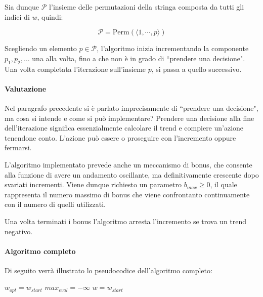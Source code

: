 Sia dunque $\mathcal{P}$ l'insieme delle permutazioni della stringa
composta da tutti gli indici di $w$, quindi:

$$
\mathcal{P} = \text{Perm}(\langle1,\cdots, p\rangle)
$$

Scegliendo un elemento $p \in \mathcal{P}$, l'algoritmo
inizia incrementando la componente $p_1, p_2, \dots$ una alla volta, fino a che
non è in grado di ``prendere una decisione".
Una volta completata l'iterazione sull'insieme $p$, si passa a quello successivo.

\paragraph{Valutazione}
Nel paragrafo precedente si è parlato imprecisamente di
``prendere una decisione", ma cosa si intende e come si può
implementare?
Prendere una decisione alla fine dell'iterazione significa essenzialmente
calcolare il trend e compiere un'azione tenendone conto. 
L'azione può essere o proseguire con l'incremento oppure
fermarsi. 

L'algoritmo implementato prevede anche un meccanismo di bonus,
che consente alla funzione di avere un andamento
oscillante, ma definitivamente crescente dopo svariati incrementi.
Viene dunque richiesto un parametro $b_{max} \geq 0$, il quale rappresenta
il numero massimo di bonus che viene confrontanto continuamente con il
numero di quelli utilizzati.

Una volta terminati i bonus l'algoritmo arresta l'incremento se trova
un trend negativo.

\pagebreak

\paragraph{Algoritmo completo}
Di seguito verrà illustrato lo pseudocodice dell'algoritmo completo:

\begin{algorithm}[h!]
	\small
	\DontPrintSemicolon
	\BlankLine
	$w_{opt} = w_{start}$\;
	$max_{eval} = -\infty$\;
	$w = w_{start}$\;
	
	\BlankLine
	
	\caption{\textsc{}}
	\label{alg:gs}
\end{algorithm}



